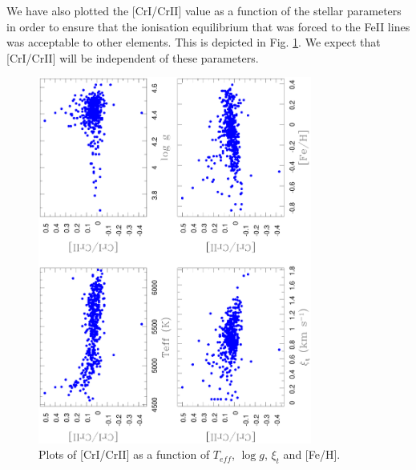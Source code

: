 \documentclass[oldversion]{aa}
\begin{document}


We have also plotted the [CrI/CrII] value as a function of the stellar parameters in order to ensure that the ionisation equilibrium that was forced to the FeII lines \citep{Sousa-2008} was acceptable to other elements. %
This is depicted in Fig. \ref{fig:cr2cr1}. We expect that [CrI/CrII] will be independent of these parameters.

\begin{figure}[t]
\centering
\includegraphics[angle=-90, trim=8mm 0mm 5mm 10mm, clip, width=9cm]{pics/CrICrIIpaper.eps}
\caption[Plots of CrI/CrII]{Plots of [CrI/CrII] as a function of $T_{eff}$, $\log g$, $\xi_t$ and [Fe/H].}
\label{fig:cr2cr1}
\end{figure}
\end{document}
